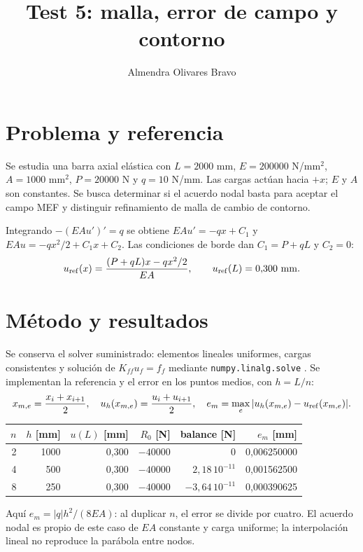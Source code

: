 \documentclass[11pt]{article}
\title{Test 5: malla, error de campo y contorno}
\author{Almendra Olivares Bravo}
\date{}
\begin{document}
\maketitle
\section{Problema y referencia}
Se estudia una barra axial elástica con $L=2000$ mm, $E=200000$ N/mm$^2$, $A=1000$ mm$^2$, $P=20000$ N y $q=10$ N/mm. Las cargas actúan hacia $+x$; $E$ y $A$ son constantes. Se busca determinar si el acuerdo nodal basta para aceptar el campo MEF y distinguir refinamiento de malla de cambio de contorno.
\begin{center}
\end{center}
Integrando $-(EAu')'=q$ se obtiene $EAu'=-qx+C_1$ y $EAu=-qx^2/2+C_1x+C_2$. Las condiciones de borde dan $C_1=P+qL$ y $C_2=0$:
\[
u_{\rm ref}(x)=\frac{(P+qL)x-qx^2/2}{EA},\qquad u_{\rm ref}(L)=0{,}300\ \mathrm{mm}.
\]
\section{Método y resultados}
Se conserva el solver suministrado: elementos lineales uniformes, cargas consistentes y solución de $K_{ff}u_f=f_f$ mediante \texttt{numpy.linalg.solve} \cite{numpy}. Se implementan la referencia y el error en los puntos medios, con $h=L/n$:
\[
x_{m,e}=\frac{x_i+x_{i+1}}2,\quad u_h(x_{m,e})=\frac{u_i+u_{i+1}}2,\quad e_m=\max_e|u_h(x_{m,e})-u_{\rm ref}(x_{m,e})|.
\]
\begin{center}
\begin{tabular}{rrrrrr}
\toprule
$n$ & $h$ [mm] & $u(L)$ [mm] & $R_0$ [N] & balance [N] & $e_m$ [mm]\\
\midrule
2 & 1000 & 0,300 & $-40000$ & 0 & 0,006250000\\
4 & 500 & 0,300 & $-40000$ & $2{,}18\,10^{-11}$ & 0,001562500\\
8 & 250 & 0,300 & $-40000$ & $-3{,}64\,10^{-11}$ & 0,000390625\\
\bottomrule
\end{tabular}
\end{center}
Aquí $e_m=|q|h^2/(8EA)$: al duplicar $n$, el error se divide por cuatro. El acuerdo nodal es propio de este caso de $EA$ constante y carga uniforme; la interpolación lineal no reproduce la parábola entre nodos.
\newpage
\end{document}
